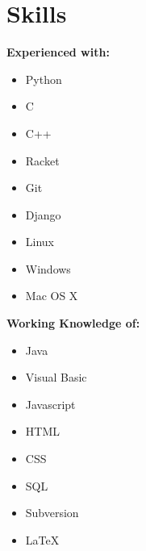 \documentclass[10pt]{article}
\begin{document}
\begin{minipage}{0.23\textwidth}
\centering\section*{\LARGE\sffamily\color{resblue}Skills}
  \raggedright{\bf Experienced with:}
  \begin{itemize}[label={\color{resblue}\textbullet}]
    \setlength\itemsep{0em}
    \item Python
    \item C
    \item C++
    \item Racket
    \item Git
    \item Django
    \item Linux
    \item Windows
    \item Mac OS X
  \end{itemize}
  \vspace{5mm}
  {\bf Working Knowledge of:}
  \begin{itemize}[label={\color{resblue}\textbullet}]
    \setlength\itemsep{0em}
    \item Java
    \item Visual Basic
    \item Javascript
    \item HTML
    \item CSS
    \item SQL
    \item Subversion
    \item \LaTeX
  \end{itemize}
\end{minipage}
\end{document}
